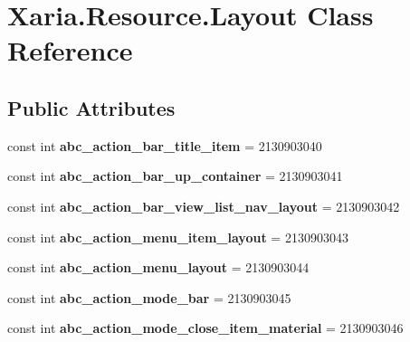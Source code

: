 \hypertarget{classXaria_1_1Resource_1_1Layout}{}\section{Xaria.\+Resource.\+Layout Class Reference}
\label{classXaria_1_1Resource_1_1Layout}
\subsection*{Public Attributes}
\begin{DoxyCompactItemize}
\item 
\mbox{\label{classXaria_1_1Resource_1_1Layout_aa01ea749f35cec2c72432267b346a4fe}} 
const int {\bfseries abc\+\_\+action\+\_\+bar\+\_\+title\+\_\+item} = 2130903040
\item 
\mbox{\label{classXaria_1_1Resource_1_1Layout_ae0a873f6bc56ed272af4565a9e6a2e90}} 
const int {\bfseries abc\+\_\+action\+\_\+bar\+\_\+up\+\_\+container} = 2130903041
\item 
\mbox{\label{classXaria_1_1Resource_1_1Layout_a73cb1bda2bd0487620fb4586d04c9bee}} 
const int {\bfseries abc\+\_\+action\+\_\+bar\+\_\+view\+\_\+list\+\_\+nav\+\_\+layout} = 2130903042
\item 
\mbox{\label{classXaria_1_1Resource_1_1Layout_ae4a5c054e9718d6805b1609a386802d2}} 
const int {\bfseries abc\+\_\+action\+\_\+menu\+\_\+item\+\_\+layout} = 2130903043
\item 
\mbox{\label{classXaria_1_1Resource_1_1Layout_a2777c8626c5c1742eff38a4848aa4adb}} 
const int {\bfseries abc\+\_\+action\+\_\+menu\+\_\+layout} = 2130903044
\item 
\mbox{\label{classXaria_1_1Resource_1_1Layout_a2c7441d20242c00fa1ccc95810cba468}} 
const int {\bfseries abc\+\_\+action\+\_\+mode\+\_\+bar} = 2130903045
\item 
\mbox{\label{classXaria_1_1Resource_1_1Layout_a48c6e27f6c9dbb2f15eacd9cfd694c71}} 
const int {\bfseries abc\+\_\+action\+\_\+mode\+\_\+close\+\_\+item\+\_\+material} = 2130903046

\end{DoxyCompactItemize}
